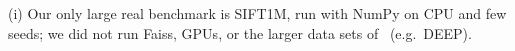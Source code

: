 (i) Our only large real benchmark is SIFT1M, run with NumPy on CPU and few seeds; we did not run Faiss, GPUs, or the larger data sets of~\cite{bessa2026} (e.g.\ DEEP).